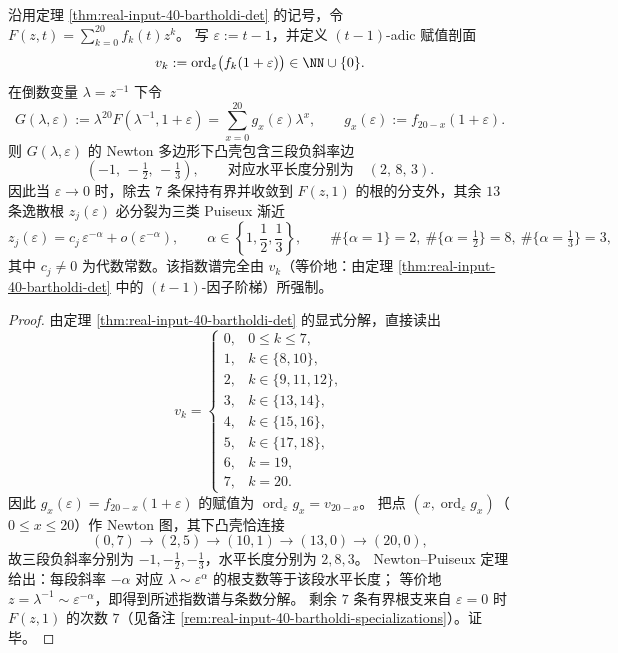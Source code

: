 \begin{proposition}[Bartholdi fugacity 在 \texorpdfstring{$t=1$}{t=1} 的 Newton--Puiseux 逸散指数谱]\label{prop:real-input-40-bartholdi-newton-puiseux-spectrum}
沿用定理 \ref{thm:real-input-40-bartholdi-det} 的记号，令 \(F(z,t)=\sum_{k=0}^{20}f_k(t)z^k\)。
写 \(\varepsilon:=t-1\)，并定义 \((t-1)\)-adic 赋值剖面
\[
v_k:=\operatorname{ord}_{\varepsilon}\bigl(f_k(1+\varepsilon)\bigr)\in\NN\cup\{0\}.
\]
在倒数变量 \(\lambda=z^{-1}\) 下令
\[
G(\lambda,\varepsilon):=\lambda^{20}F(\lambda^{-1},1+\varepsilon)
=\sum_{x=0}^{20}g_x(\varepsilon)\lambda^x,\qquad g_x(\varepsilon):=f_{20-x}(1+\varepsilon).
\]
则 \(G(\lambda,\varepsilon)\) 的 Newton 多边形下凸壳包含三段负斜率边
\[
(-1,\,-\tfrac12,\,-\tfrac13),
\qquad
\text{对应水平长度分别为}\quad (2,\,8,\,3).
\]
因此当 \(\varepsilon\to 0\) 时，除去 \(7\) 条保持有界并收敛到 \(F(z,1)\) 的根的分支外，其余 \(13\) 条逸散根 \(z_j(\varepsilon)\) 必分裂为三类 Puiseux 渐近
\[
z_j(\varepsilon)=c_j\,\varepsilon^{-\alpha}+o\!\left(\varepsilon^{-\alpha}\right),
\qquad
\alpha\in\left\{1,\frac12,\frac13\right\},
\qquad
\#\{\alpha=1\}=2,\ \#\{\alpha=\tfrac12\}=8,\ \#\{\alpha=\tfrac13\}=3,
\]
其中 \(c_j\neq 0\) 为代数常数。该指数谱完全由 \(v_k\)（等价地：由定理 \ref{thm:real-input-40-bartholdi-det} 中的 \((t-1)\)-因子阶梯）所强制。
\end{proposition}
\begin{proof}
由定理 \ref{thm:real-input-40-bartholdi-det} 的显式分解，直接读出
\[
v_k=
\begin{cases}
0,& 0\le k\le 7,\\
1,& k\in\{8,10\},\\
2,& k\in\{9,11,12\},\\
3,& k\in\{13,14\},\\
4,& k\in\{15,16\},\\
5,& k\in\{17,18\},\\
6,& k=19,\\
7,& k=20.
\end{cases}
\]
因此 \(g_x(\varepsilon)=f_{20-x}(1+\varepsilon)\) 的赋值为 \(\operatorname{ord}_{\varepsilon}g_x=v_{20-x}\)。
把点 \((x,\operatorname{ord}_{\varepsilon}g_x)\)（\(0\le x\le 20\)）作 Newton 图，其下凸壳恰连接
\[
(0,7)\to(2,5)\to(10,1)\to(13,0)\to(20,0),
\]
故三段负斜率分别为 \(-1,-\tfrac12,-\tfrac13\)，水平长度分别为 \(2,8,3\)。
Newton--Puiseux 定理给出：每段斜率 \(-\alpha\) 对应 \(\lambda\sim \varepsilon^{\alpha}\) 的根支数等于该段水平长度；
等价地 \(z=\lambda^{-1}\sim \varepsilon^{-\alpha}\)，即得到所述指数谱与条数分解。
剩余 \(7\) 条有界根支来自 \(\varepsilon=0\) 时 \(F(z,1)\) 的次数 \(7\)（见备注 \ref{rem:real-input-40-bartholdi-specializations}）。证毕。
\end{proof}

